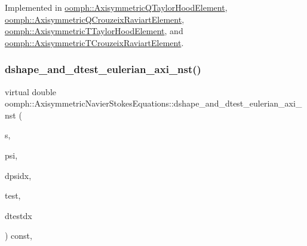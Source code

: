 Implemented in \hyperlink{classoomph_1_1AxisymmetricQTaylorHoodElement_a77fe7f0caef36c951f99a923b94c2f7a}{oomph\+::\+Axisymmetric\+Q\+Taylor\+Hood\+Element}, \hyperlink{classoomph_1_1AxisymmetricQCrouzeixRaviartElement_abef9fe3b35d6a0eb08b18a33aa6b03c7}{oomph\+::\+Axisymmetric\+Q\+Crouzeix\+Raviart\+Element}, \hyperlink{classoomph_1_1AxisymmetricTTaylorHoodElement_a6bfdf91d1ce67542d27bee00ab026a20}{oomph\+::\+Axisymmetric\+T\+Taylor\+Hood\+Element}, and \hyperlink{classoomph_1_1AxisymmetricTCrouzeixRaviartElement_a63923a44d4da4e1720449521c82f1c42}{oomph\+::\+Axisymmetric\+T\+Crouzeix\+Raviart\+Element}.

\mbox{\label{classoomph_1_1AxisymmetricNavierStokesEquations_a8d958da8ef73dcf5c68360edc9d9f565}} 
\subsubsection{\texorpdfstring{dshape\+\_\+and\+\_\+dtest\+\_\+eulerian\+\_\+axi\+\_\+nst()}{dshape\_and\_dtest\_eulerian\_axi\_nst()}}
{\footnotesize\ttfamily virtual double oomph\+::\+Axisymmetric\+Navier\+Stokes\+Equations\+::dshape\+\_\+and\+\_\+dtest\+\_\+eulerian\+\_\+axi\+\_\+nst (\begin{DoxyParamCaption}\item[{const \hyperlink{classoomph_1_1Vector}{Vector}$<$ double $>$ \&}]{s,  }\item[{\hyperlink{classoomph_1_1Shape}{Shape} \&}]{psi,  }\item[{\hyperlink{classoomph_1_1DShape}{D\+Shape} \&}]{dpsidx,  }\item[{\hyperlink{classoomph_1_1Shape}{Shape} \&}]{test,  }\item[{\hyperlink{classoomph_1_1DShape}{D\+Shape} \&}]{dtestdx }\end{DoxyParamCaption}) const\hspace{0.3cm}{\ttfamily [protected]}, {}}



